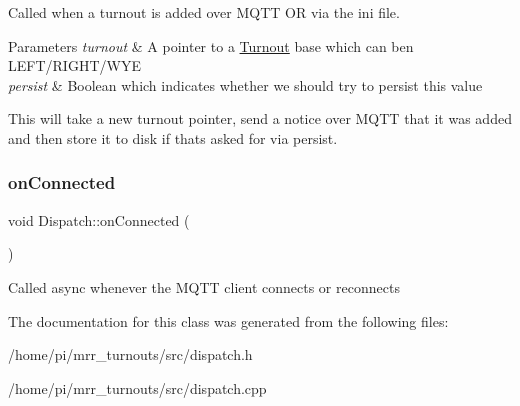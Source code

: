 Called when a turnout is added over M\+Q\+TT OR via the ini file. 


\begin{DoxyParams}{Parameters}
{\em turnout} & A pointer to a \hyperlink{classTurnout}{Turnout} base which can ben L\+E\+F\+T/\+R\+I\+G\+H\+T/\+W\+YE \\
\hline
{\em persist} & Boolean which indicates whether we should try to persist this value\\
\hline
\end{DoxyParams}
This will take a new turnout pointer, send a notice over M\+Q\+TT that it was added and then store it to disk if that\textquotesingle{}s asked for via persist. \mbox{\label{classDispatch_a9778159aee91f361533c1121b49b507b}} 
\subsubsection{\texorpdfstring{on\+Connected}{onConnected}}
{\footnotesize\ttfamily void Dispatch\+::on\+Connected (\begin{DoxyParamCaption}{ }\end{DoxyParamCaption})\hspace{0.3cm}{\ttfamily [slot]}}

Called async whenever the M\+Q\+TT client connects or reconnects 

The documentation for this class was generated from the following files\+:\begin{DoxyCompactItemize}
\item 
/home/pi/mrr\+\_\+turnouts/src/dispatch.\+h\item 
/home/pi/mrr\+\_\+turnouts/src/dispatch.\+cpp\end{DoxyCompactItemize}

